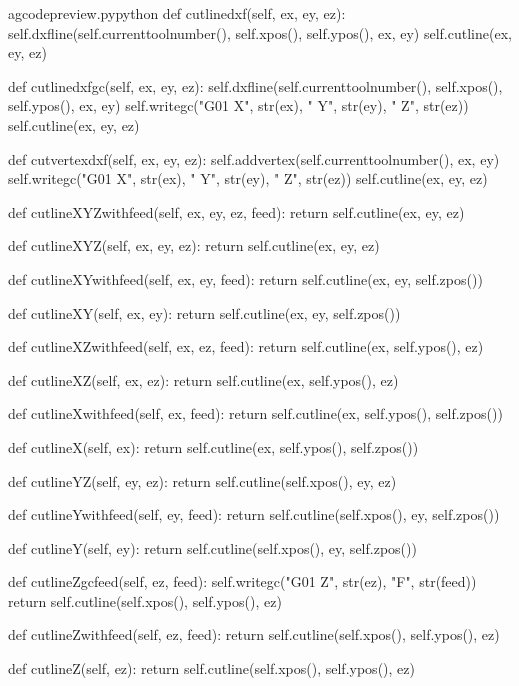 \documentclass{ltxdoc}
\begin{document}
\lstset{firstnumber=\thegcpy}
\begin{writecode}{a}{gcodepreview.py}{python}
    def cutlinedxf(self, ex, ey, ez):
        self.dxfline(self.currenttoolnumber(), self.xpos(), self.ypos(), ex, ey)
        self.cutline(ex, ey, ez)

    def cutlinedxfgc(self, ex, ey, ez):
        self.dxfline(self.currenttoolnumber(), self.xpos(), self.ypos(), ex, ey)
        self.writegc("G01 X", str(ex), " Y", str(ey), " Z", str(ez))
        self.cutline(ex, ey, ez)

    def cutvertexdxf(self, ex, ey, ez):
        self.addvertex(self.currenttoolnumber(), ex, ey)
        self.writegc("G01 X", str(ex), " Y", str(ey), " Z", str(ez))
        self.cutline(ex, ey, ez)

    def cutlineXYZwithfeed(self, ex, ey, ez, feed):
        return self.cutline(ex, ey, ez)

    def cutlineXYZ(self, ex, ey, ez):
        return self.cutline(ex, ey, ez)

    def cutlineXYwithfeed(self, ex, ey, feed):
        return self.cutline(ex, ey, self.zpos())

    def cutlineXY(self, ex, ey):
        return self.cutline(ex, ey, self.zpos())

    def cutlineXZwithfeed(self, ex, ez, feed):
        return self.cutline(ex, self.ypos(), ez)

    def cutlineXZ(self, ex, ez):
        return self.cutline(ex, self.ypos(), ez)

    def cutlineXwithfeed(self, ex, feed):
        return self.cutline(ex, self.ypos(), self.zpos())

    def cutlineX(self, ex):
        return self.cutline(ex, self.ypos(), self.zpos())

    def cutlineYZ(self, ey, ez):
        return self.cutline(self.xpos(), ey, ez)

    def cutlineYwithfeed(self, ey, feed):
        return self.cutline(self.xpos(), ey, self.zpos())

    def cutlineY(self, ey):
        return self.cutline(self.xpos(), ey, self.zpos())

    def cutlineZgcfeed(self, ez, feed):
        self.writegc("G01 Z", str(ez), "F", str(feed))
        return self.cutline(self.xpos(), self.ypos(), ez)

    def cutlineZwithfeed(self, ez, feed):
        return self.cutline(self.xpos(), self.ypos(), ez)

    def cutlineZ(self, ez):
        return self.cutline(self.xpos(), self.ypos(), ez)

\end{writecode}
\addtocounter{gcpy}{57}
\end{document}
